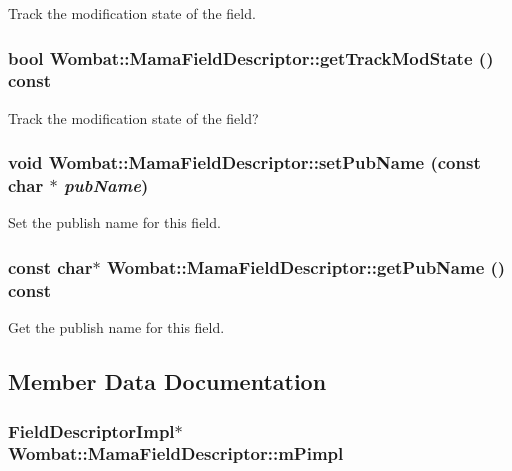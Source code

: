 Track the modification state of the field. \hypertarget{classWombat_1_1MamaFieldDescriptor_a50225e51ecace29ece3907796c38615f}{
\subsubsection[{getTrackModState}]{\setlength{\rightskip}{0pt plus 5cm}bool Wombat::MamaFieldDescriptor::getTrackModState () const}}
\label{classWombat_1_1MamaFieldDescriptor_a50225e51ecace29ece3907796c38615f}


Track the modification state of the field? \hypertarget{classWombat_1_1MamaFieldDescriptor_a58f48b3c9ad1d7b56f663089c5dba395}{
\subsubsection[{setPubName}]{\setlength{\rightskip}{0pt plus 5cm}void Wombat::MamaFieldDescriptor::setPubName (const char $\ast$ {\em pubName})}}
\label{classWombat_1_1MamaFieldDescriptor_a58f48b3c9ad1d7b56f663089c5dba395}


Set the publish name for this field. \hypertarget{classWombat_1_1MamaFieldDescriptor_acb20f166bf1e0280a82943bf6e6234fd}{
\subsubsection[{getPubName}]{\setlength{\rightskip}{0pt plus 5cm}const char$\ast$ Wombat::MamaFieldDescriptor::getPubName () const}}
\label{classWombat_1_1MamaFieldDescriptor_acb20f166bf1e0280a82943bf6e6234fd}


Get the publish name for this field. 

\subsection{Member Data Documentation}
\hypertarget{classWombat_1_1MamaFieldDescriptor_ac5003e3b2ed4fdf662ba1baa4eef967f}{
\subsubsection[{mPimpl}]{\setlength{\rightskip}{0pt plus 5cm}FieldDescriptorImpl$\ast$ {\bf Wombat::MamaFieldDescriptor::mPimpl}}}
\label{classWombat_1_1MamaFieldDescriptor_ac5003e3b2ed4fdf662ba1baa4eef967f}
